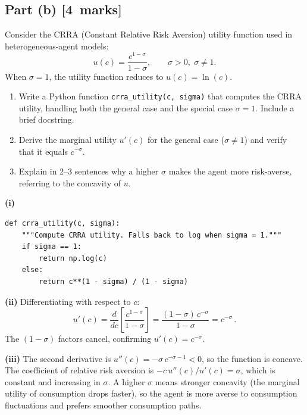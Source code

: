 \documentclass[11pt,a4paper]{article}
\newcommand{\mkpts}[1]{\hfill\textbf{[#1~marks]}}
\begin{document}
\subsection*{Part (b) \mkpts{4}}

Consider the CRRA (Constant Relative Risk Aversion) utility function used in heterogeneous-agent models:
\[
u(c) = \frac{c^{1-\sigma}}{1-\sigma}, \qquad \sigma > 0,\; \sigma \neq 1.
\]
When $\sigma = 1$, the utility function reduces to $u(c) = \ln(c)$.

\begin{enumerate}[label=(\roman*),nosep]
\item Write a Python function \texttt{crra\_utility(c, sigma)} that computes the CRRA utility, handling both the general case and the special case $\sigma=1$.  Include a brief docstring.
\item Derive the marginal utility $u'(c)$ for the general case ($\sigma\neq 1$) and verify that it equals $c^{-\sigma}$.
\item Explain in 2--3 sentences why a higher $\sigma$ makes the agent more risk-averse, referring to the concavity of $u$.
\end{enumerate}

\begin{solution}
\textbf{(i)}
\begin{lstlisting}[numbers=none]
def crra_utility(c, sigma):
    """Compute CRRA utility. Falls back to log when sigma = 1."""
    if sigma == 1:
        return np.log(c)
    else:
        return c**(1 - sigma) / (1 - sigma)
\end{lstlisting}

\textbf{(ii)} Differentiating with respect to $c$:
\[
u'(c) = \frac{d}{dc}\left[\frac{c^{1-\sigma}}{1-\sigma}\right] = \frac{(1-\sigma)\,c^{-\sigma}}{1-\sigma} = c^{-\sigma}\,.
\]
The $(1-\sigma)$ factors cancel, confirming $u'(c) = c^{-\sigma}$.

\medskip

\textbf{(iii)} The second derivative is $u''(c) = -\sigma\,c^{-\sigma-1} < 0$, so the function is concave.  The coefficient of relative risk aversion is $-c\,u''(c)/u'(c) = \sigma$, which is constant and increasing in $\sigma$.  A higher $\sigma$ means stronger concavity (the marginal utility of consumption drops faster), so the agent is more averse to consumption fluctuations and prefers smoother consumption paths.
\end{solution}


\newpage
\end{document}
